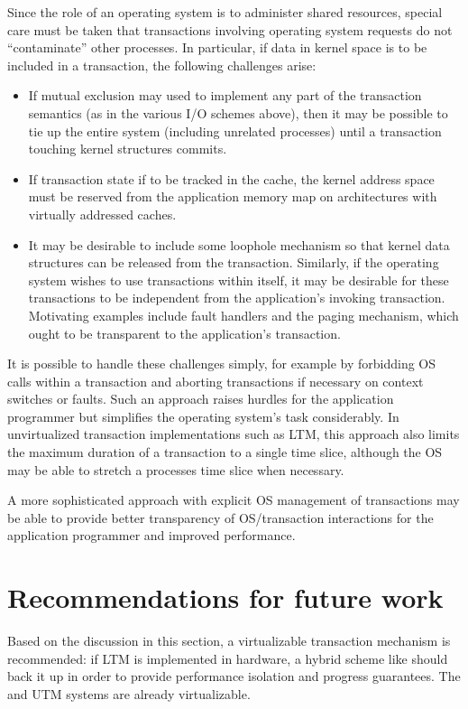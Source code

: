 Since the role of an operating system is to administer shared
resources, special care must be taken that transactions involving
operating system requests do not ``contaminate'' other processes.
In particular, if data in kernel space is to be included in a
transaction, the following challenges arise:
\begin{itemize}
\item If mutual exclusion may used to implement any part of the
transaction semantics (as in the various I/O schemes above), then it
may be possible to tie up the entire system (including unrelated
processes) until a transaction touching kernel structures commits.
\item If transaction state if to be tracked in the cache, the
kernel address space must be reserved from the application memory map
 on architectures with virtually addressed caches.
\item It may be desirable to include some loophole mechanism
 so that kernel data structures can be released from the transaction.
 Similarly, if the operating system wishes to use transactions within
 itself, it may be desirable for these transactions to be independent
 from the application's invoking transaction.  Motivating examples
 include fault handlers and the paging mechanism, which ought to be
 transparent to the application's transaction.  
\end{itemize}

It is possible to handle these challenges simply, for example by
forbidding OS calls within a transaction and aborting transactions if
necessary on context switches or faults.  Such an approach raises
hurdles for the application programmer but simplifies the operating
system's task considerably.  In unvirtualized transaction
implementations such as LTM, this approach also limits the maximum
duration of a transaction to a single time slice, although the OS may
be able to stretch a processes time slice when necessary.

A more sophisticated approach with explicit OS management of
transactions may be able to provide better transparency of
OS/transaction interactions for the application programmer and
improved performance.

\section{Recommendations for future work}
Based on the discussion in this section, a virtualizable transaction
mechanism is recommended: if LTM is implemented in hardware, a hybrid
scheme like \hyx should back it up in order to provide performance
isolation and progress guarantees.  The \apex and UTM systems are
already virtualizable.

